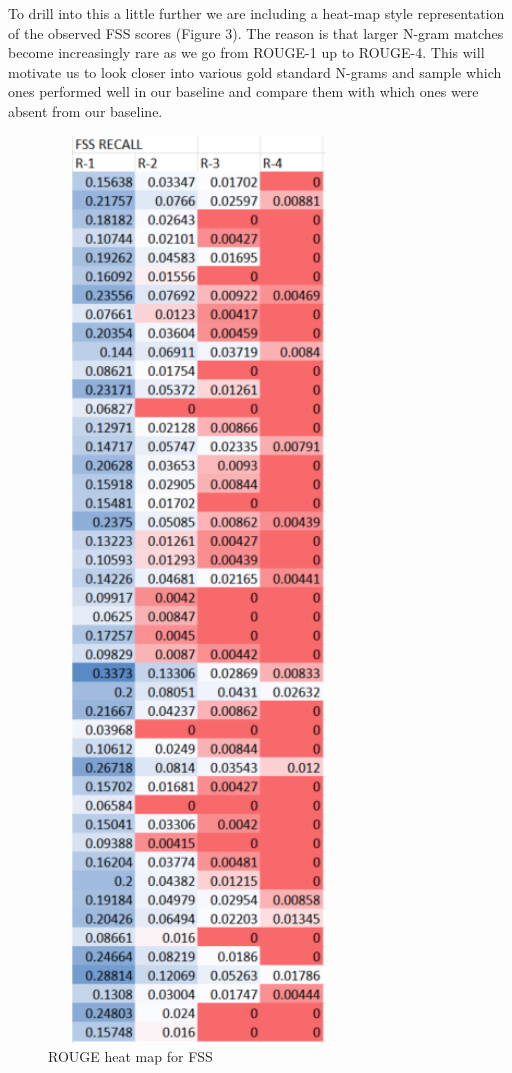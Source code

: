 \documentclass[11pt,a4paper]{article}
\begin{document}
To drill into this a little further we are including a heat-map style representation of the observed FSS scores (Figure 3). The reason is that larger N-gram matches become increasingly rare as we go from ROUGE-1 up to ROUGE-4. This will motivate us to look closer into various gold standard N-grams and sample which ones performed well in our baseline and compare them with which ones were absent from our baseline.

\begin{figure}
\caption{ROUGE heat map for FSS}
\includegraphics[width=80mm,height=240mm,scale=0.1]{rouge_heat_map.png}
\end{figure}
\end{document}

